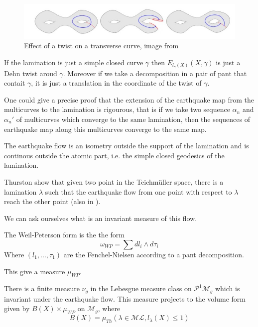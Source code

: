 \begin{figure}[h!]
\centering
\includegraphics[width=12cm]{Image/Earthquake.jpg}
\caption{Effect of a twist on a transverse curve, image from \cite{wright2020tour}}
\end{figure}

\begin{rmq}
If the lamination is just a simple closed curve $\gamma$ then $E_{l_{\gamma}(X)}(X,\gamma)$ is just a Dehn twist aroud $\gamma$.
Moreover if we take a decomposition in a pair of pant that contait $\gamma$, it is just a translation in the coordinate of the twist of $\gamma$.
\end{rmq}

One could give a precise proof that the extension of the earthquake map from the multicurves to the lamination is rigourous, that is if we take two sequence $\alpha_n$ and $\alpha_n'$ of multicurves which converge to the same lamination, then the sequences of earthquake map along this multicurves converge to the same map.



\begin{rmq}
The earthquake flow is an isometry outside the support of the lamination and is continous outside the atomic part, i.e. the simple closed geodesics of the lamination.
\end{rmq}

Thurston show that given two point in the Teichmüller space, there is a lamination $\lambda$ such that the earthquake flow from one point with respect to $\lambda$ reach the other point (also in \cite{NielsenRealizationPro}).

We can ask ourselves what is an invariant measure of this flow.

\begin{dfnt}
The Weil-Peterson form is the the form \[
\omega_{WP} = \sum d l_i \wedge d \tau_i
\]
Where $(l_1,...,\tau_1)$ are the Fenchel-Nielsen according to a pant decomposition.

This give a measure $\mu_{WP}$.
\end{dfnt}

There is a finite measure $\nu_g$ in the Lebesgue measure class on $\mathcal{P}^1 \mathcal{M}_g$ which is invariant under the earthquake flow. This measure projects to the volume form given by $B(X) \times \mu_{WP}$ on $\mathcal{M}_g$, where \[
B(X)=\mu_{Th}(\lambda \in \mathcal{ML}, l_\lambda(X) \leq 1)
\]

